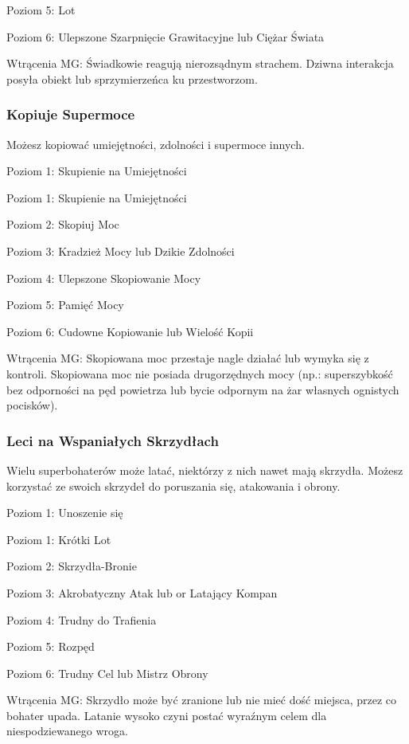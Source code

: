 Poziom 5: Lot

Poziom 6: Ulepszone Szarpnięcie Grawitacyjne lub Ciężar Świata

Wtrącenia MG: Świadkowie reagują nierozsądnym strachem. Dziwna interakcja posyła obiekt lub sprzymierzeńca ku przestworzom.

\subsubsection{Kopiuje Supermoce}

Możesz kopiować umiejętności, zdolności i supermoce innych. 

Poziom 1: Skupienie na Umiejętności

Poziom 1: Skupienie na Umiejętności

Poziom 2: Skopiuj Moc

Poziom 3: Kradzież Mocy lub Dzikie Zdolności

Poziom 4: Ulepszone Skopiowanie Mocy

Poziom 5: Pamięć Mocy

Poziom 6: Cudowne Kopiowanie lub Wielość Kopii

Wtrącenia MG: Skopiowana moc przestaje nagle działać lub wymyka się z kontroli. Skopiowana moc nie posiada drugorzędnych mocy (np.: superszybkość bez odporności na pęd powietrza lub bycie odpornym na żar własnych ognistych pocisków). 

\subsubsection{Leci na Wspaniałych Skrzydłach}

Wielu superbohaterów może latać, niektórzy z nich nawet mają skrzydła. Możesz korzystać ze swoich skrzydeł do poruszania się, atakowania i obrony.

Poziom 1: Unoszenie się

Poziom 1: Krótki Lot

Poziom 2: Skrzydła-Bronie

Poziom 3: Akrobatyczny Atak lub or Latający Kompan

Poziom 4: Trudny do Trafienia

Poziom 5: Rozpęd

Poziom 6: Trudny Cel lub Mistrz Obrony

Wtrącenia MG: Skrzydło może być zranione lub nie mieć dość miejsca, przez co bohater upada. Latanie wysoko czyni postać wyraźnym celem dla niespodziewanego wroga. 

